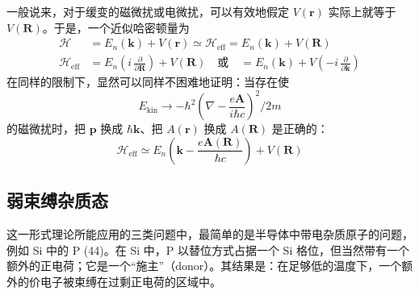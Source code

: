 
一般说来，对于缓变的磁微扰或电微扰，可以有效地假定 $V(\mathbf{r})$ 实际上就等于 $V(\mathbf{R})$。于是，一个近似哈密顿量为
\begin{align*}
\mathcal{H} &= E_n(\mathbf{k}) + V(\mathbf{r}) \simeq \mathcal{H}_{\text{eff}} = E_n(\mathbf{k}) + V(\mathbf{R}) \\
\mathcal{H}_{\text{eff}} &= E_n\!\left(i\,\frac{\partial}{\partial\mathbf{R}}\right) + V(\mathbf{R}) \quad\text{或}\quad = E_n(\mathbf{k}) + V\!\left(-i\,\frac{\partial}{\partial\mathbf{k}}\right)
\end{align*}
在同样的限制下，显然可以同样不困难地证明：当存在使
\begin{equation*}
E_{\text{kin}} \to -\hbar^2\left(\nabla - \frac{e\mathbf{A}}{i\hbar c}\right)^{\!2}\Big/2m
\end{equation*}
的磁微扰时，把 $\mathbf{p}$ 换成 $\hbar\mathbf{k}$、把 $A(\mathbf{r})$ 换成 $A(\mathbf{R})$ 是正确的：
\begin{equation*}
\mathcal{H}_{\text{eff}} \simeq E_n\!\left(\mathbf{k} - \frac{e\mathbf{A}(\mathbf{R})}{\hbar c}\right) + V(\mathbf{R})
\end{equation*}

\subsection{弱束缚杂质态}

这一形式理论所能应用的三类问题中，最简单的是半导体中带电杂质原子的问题，例如 Si 中的 P (44)。在 Si 中，P 以替位方式占据一个 Si 格位，但当然带有一个额外的正电荷；它是一个“施主”（donor）。其结果是：在足够低的温度下，一个额外的价电子被束缚在过剩正电荷的区域中。

